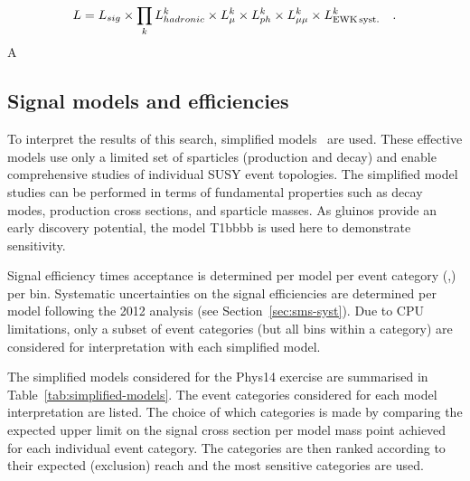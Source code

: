\begin{equation}
L = L_{sig}\times \prod_k L_{hadronic}^k
\times L_{\mu}^k \times L_{ph}^k \times L_{\mu\mu}^k \times L_{\rm EWK\, syst.}^k \quad .
\end{equation}
A
\subsection{Signal models and efficiencies\label{sec:signal}}
To interpret the results of this search, simplified
models~\cite{Alwall:2008ag,Alwall:2008va,sms} are used. These
effective models use only a limited set of sparticles (production and
decay) and enable comprehensive studies of individual SUSY event
topologies. The simplified model studies can be performed in terms of
fundamental properties such as decay modes, production cross sections,
and sparticle masses. As gluinos provide an early discovery potential, the model
T1bbbb is used here to demonstrate sensitivity.

Signal efficiency times acceptance is determined per model per event
category (\njet,\nb) per \scalht bin. Systematic
uncertainties on the signal efficiencies are determined per model
following the 2012 analysis (see Section~\ref{sec:sms-syst}). Due to CPU
limitations, only a subset of event categories (but all \scalht bins
within a category) are considered for interpretation with each
simplified model. 


The simplified models considered for the Phys14 exercise are summarised in
Table~\ref{tab:simplified-models}. The event categories considered for
each model interpretation are listed. The choice of which categories
is made by comparing the expected upper limit on the signal cross section 
per model mass point achieved for each individual event category. 
The categories are then ranked according to their expected (exclusion) reach 
and the most sensitive categories are used. 


